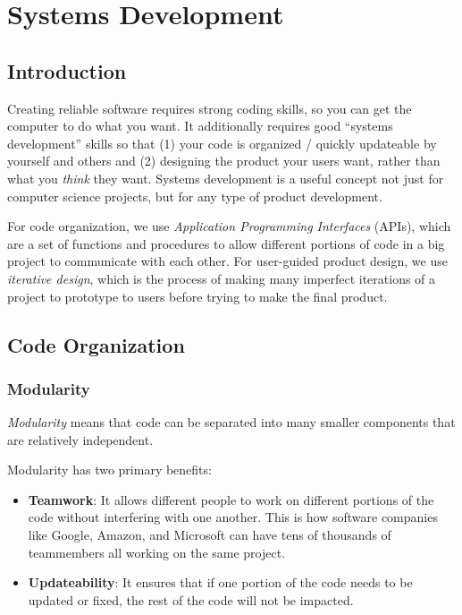\chapter{Systems Development}

\section{Introduction}
Creating reliable software requires strong coding skills, so you can get the
computer to do what you want. It additionally requires good ``systems development'' skills so that (1) your code is organized / quickly updateable by yourself and others and (2) designing the product your users want, rather than what you \emph{think} they want. Systems development is a useful concept not just for computer science projects, but for any type of product development. 

For code organization, we use \emph{Application Programming Interfaces} (APIs), which are a set of functions and procedures to allow different portions of code in a big project to communicate with each other. For user-guided product design, we use \emph{iterative design}, which is the process of making many imperfect iterations of a project to prototype to users before trying to make the final product. 

\section{Code Organization}

 \subsection{Modularity}
 \begin{definition}
 \emph{Modularity} means that code can be separated into many smaller components that are relatively independent. 
 \end{definition}
 
Modularity has two primary benefits:
\begin{itemize}
\item \textbf{Teamwork}: It allows different people to work on different portions of the code without interfering with one another. This is how software companies like Google, Amazon, and Microsoft can have tens of thousands of teammembers all working on the same project.
\item \textbf{Updateability}: It ensures that if one portion of the code needs to be updated or fixed, the rest of the code will not be impacted. 
\end{itemize} 

